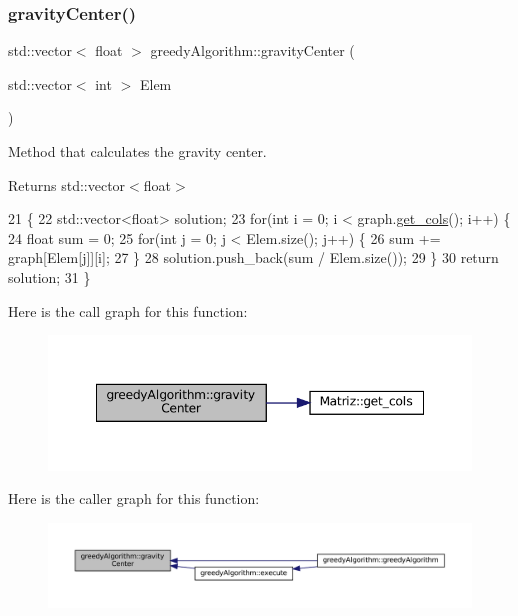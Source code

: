 \subsubsection{\texorpdfstring{gravity\+Center()}{gravityCenter()}}
{\footnotesize\ttfamily std\+::vector$<$ float $>$ greedy\+Algorithm\+::gravity\+Center (\begin{DoxyParamCaption}\item[{std\+::vector$<$ int $>$}]{Elem }\end{DoxyParamCaption})}



Method that calculates the gravity center. 

\begin{DoxyReturn}{Returns}
std\+::vector$<$float$>$ 
\end{DoxyReturn}

\begin{DoxyCode}
21                                                                    \{
22   std::vector<float> solution;
23   \textcolor{keywordflow}{for}(\textcolor{keywordtype}{int} i = 0; i < graph.\hyperlink{classMatriz_ad6915f9b31f93230a3ce05d01d23a47b}{get\_cols}(); i++) \{
24     \textcolor{keywordtype}{float} sum = 0;
25     \textcolor{keywordflow}{for}(\textcolor{keywordtype}{int} j = 0; j < Elem.size(); j++) \{      
26       sum += graph[Elem[j]][i]; 
27     \}
28     solution.push\_back(sum / Elem.size());
29   \}
30   \textcolor{keywordflow}{return} solution;
31 \}
\end{DoxyCode}
Here is the call graph for this function\+:
\nopagebreak
\begin{figure}[H]
\begin{center}
\leavevmode
\includegraphics[width=348pt]{classgreedyAlgorithm_a1ba2f9ae707c3d68f0af86ea320f80cf_cgraph}
\end{center}
\end{figure}
Here is the caller graph for this function\+:
\nopagebreak
\begin{figure}[H]
\begin{center}
\leavevmode
\includegraphics[width=350pt]{classgreedyAlgorithm_a1ba2f9ae707c3d68f0af86ea320f80cf_icgraph}
\end{center}
\end{figure}
\mbox{\label{classgreedyAlgorithm_a523e81ad05f34731d5259e712b0b6ee5}} 
